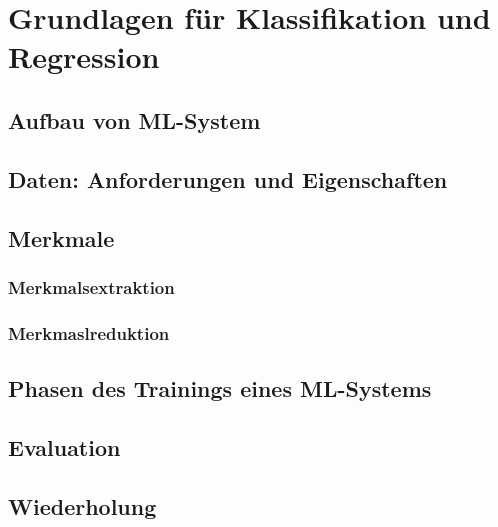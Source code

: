 \documentclass[a4paper]{article}
\title{\docTitle}
\author{Moritz}
\date{\today}
\begin{document}
\maketitle
\tableofcontents


\section{Grundlagen für Klassifikation und Regression}

\subsection{Aufbau von ML-System}

\subsection{Daten: Anforderungen und Eigenschaften}

\subsection{Merkmale}

\subsubsection{Merkmalsextraktion}

\subsubsection{Merkmaslreduktion}

\subsection{Phasen des Trainings eines ML-Systems}

\subsection{Evaluation}


\subsection{Wiederholung}
\end{document}
